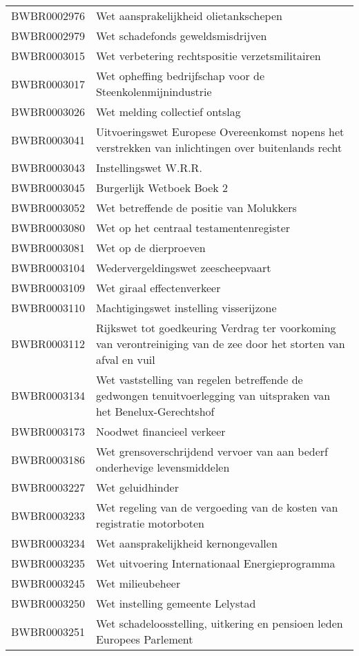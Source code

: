 \begin{longtable}{lp{}}
BWBR0002976 & Wet aansprakelijkheid olietankschepen \\
BWBR0002979 & Wet schadefonds geweldsmisdrijven \\
BWBR0003015 & Wet verbetering rechtspositie verzetsmilitairen \\
BWBR0003017 & Wet opheffing bedrijfschap voor de Steenkolenmijnindustrie \\
BWBR0003026 & Wet melding collectief ontslag \\
BWBR0003041 & Uitvoeringswet Europese Overeenkomst nopens het verstrekken van inlichtingen over buitenlands recht \\
BWBR0003043 & Instellingswet W.R.R. \\
BWBR0003045 & Burgerlijk Wetboek Boek 2 \\
BWBR0003052 & Wet betreffende de positie van Molukkers \\
BWBR0003080 & Wet op het centraal testamentenregister \\
BWBR0003081 & Wet op de dierproeven \\
BWBR0003104 & Wedervergeldingswet zeescheepvaart \\
BWBR0003109 & Wet giraal effectenverkeer \\
BWBR0003110 & Machtigingswet instelling visserijzone \\
BWBR0003112 & Rijkswet tot goedkeuring Verdrag ter voorkoming van verontreiniging van de zee door het storten van afval en vuil \\
BWBR0003134 & Wet vaststelling van regelen betreffende de gedwongen tenuitvoerlegging van uitspraken van het Benelux-Gerechtshof \\
BWBR0003173 & Noodwet financieel verkeer \\
BWBR0003186 & Wet grensoverschrijdend vervoer van aan bederf onderhevige levensmiddelen  \\
BWBR0003227 & Wet geluidhinder \\
BWBR0003233 & Wet regeling van de vergoeding van de kosten van registratie motorboten  \\
BWBR0003234 & Wet aansprakelijkheid kernongevallen \\
BWBR0003235 & Wet uitvoering Internationaal Energieprogramma  \\
BWBR0003245 & Wet milieubeheer \\
BWBR0003250 & Wet instelling gemeente Lelystad \\
BWBR0003251 & Wet schadeloosstelling, uitkering en pensioen leden Europees Parlement \\

\end{longtable}
